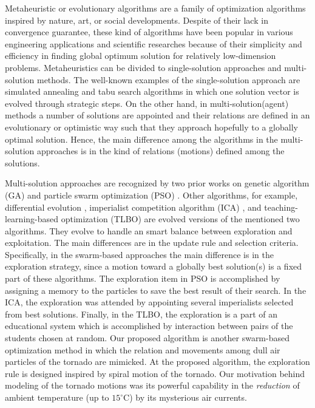 \documentclass[conference]{IEEEtran}
\begin{document}
Metaheuristic or evolutionary algorithms are a family of optimization algorithms inspired by nature, art, or social developments. Despite of their lack in convergence guarantee, these kind of algorithms have been popular in various engineering applications and scientific researches because of their simplicity and efficiency in finding global optimum solution for relatively low-dimension problems. Metaheuristics can be divided to single-solution approaches and multi-solution methods. The well-known examples of the single-solution approach are simulated annealing \cite{SA83} and tabu search \cite{Tabu89} algorithms in which one solution vector is evolved through strategic steps. On the other hand, in multi-solution(agent) methods a number of solutions are appointed and their relations are defined in an evolutionary or optimistic way such that they approach hopefully to a globally optimal solution. Hence, the main difference among the algorithms in the multi-solution approaches is in the kind of relations (motions) defined among the solutions.

Multi-solution approaches are recognized by two prior works on genetic algorithm (GA) \cite{Holland92} and particle swarm optimization (PSO) \cite{JK95}. Other algorithms, for example, differential evolution \cite{RS97}, imperialist competition algorithm (ICA) \cite{EA07}, and teaching-learning-based optimization (TLBO) \cite{TLBO11} are evolved versions of the mentioned two algorithms. They evolve to handle an smart balance between exploration and exploitation. The main differences are in the update rule and selection criteria. Specifically, in the swarm-based approaches the main difference is in the exploration strategy, since a motion toward a globally best solution(s) is a fixed part of these algorithms. The exploration item in PSO is accomplished by assigning a memory to the particles to save the best result of their search. In the ICA, the exploration was attended by appointing several imperialists selected from best solutions. Finally, in the TLBO, the exploration is a part of an educational system which is accomplished by interaction between pairs of the students chosen at random. Our proposed algorithm is another swarm-based optimization method in which the relation and movements among dull air particles of the tornado are mimicked. At the proposed algorithm, the exploration rule is designed inspired by spiral motion of the tornado. Our motivation behind modeling of the tornado motions was its powerful capability in the \emph{reduction} of ambient temperature (up to $15^{\circ}$C) by its mysterious air currents.
\end{document}
